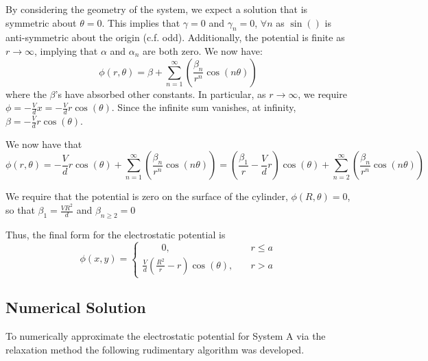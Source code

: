 \documentclass[12pt, a4paper]{article}
\newcommand{\be}{\begin{equation}}
\newcommand{\ee}{\end{equation}}
\begin{document}
By considering the geometry of the system, we expect a solution that is symmetric
about $\theta=0$. This implies that $\gamma = 0$ and $\gamma_n=0$, $\forall n$ as
$\sin()$ is anti-symmetric about the origin (c.f. odd). Additionally, the potential
is finite as $r \rightarrow \infty$, implying that $\alpha$ and $\alpha_n$ are both
zero. We now have:
%
\be
\phi(r,\theta)=\beta + \sum_{n=1}^{\infty}(\frac{\beta_n}{r^n} \cos(n\theta))
\ee
%
where the $\beta$'s have absorbed other constants. In particular, as
$r \rightarrow \infty$, we require $\phi=-\frac{V}{d}x=-\frac{V}{d}r\cos(\theta)$.
Since the infinite sum vanishes, at infinity, $\beta=-\frac{V}{d}r\cos(\theta)$.

We now have that
%
\be
\phi(r,\theta)=-\frac{V}{d}r\cos(\theta) + \sum_{n=1}^{\infty}(\frac{\beta_n}{r^n} \cos(n\theta))
              =(\frac{\beta_1}{r}-\frac{V}{d}r)\cos(\theta) + \sum_{n=2}^{\infty}(\frac{\beta_n}{r^n} \cos(n\theta))
\ee

We require that the potential is zero on the surface of the cylinder,
$\phi(R,\theta)=0$, so that $\beta_1=\frac{VR^2}{d}$ and $\beta_{n \geq 2}=0$

Thus, the final form for the electrostatic potential is
%
\be
\phi(x,y)=
\begin{cases} \qquad 0, & \quad r \leq a \\
\frac{V}{d}(\frac{R^2}{r}-r)\cos(\theta), & \quad r > a
\end{cases}
\ee

\subsection{Numerical Solution}

To numerically approximate the electrostatic potential for System A via the 
relaxation method the following rudimentary algorithm was developed.
\end{document}
